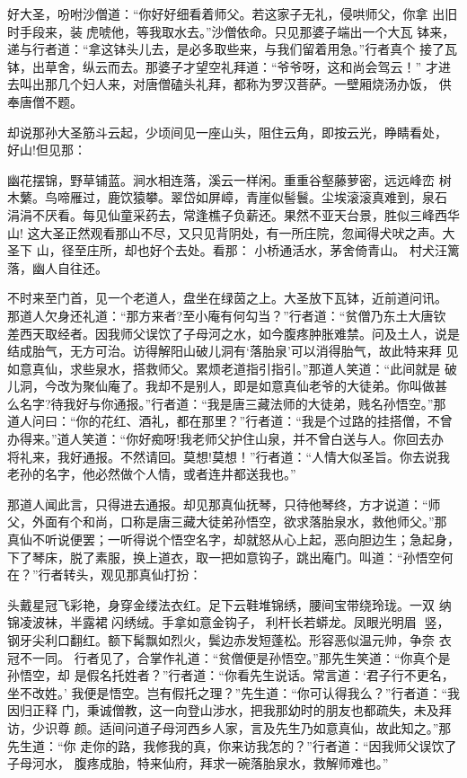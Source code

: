 好大圣，吩咐沙僧道：“你好好细看着师父。若这家子无礼，侵哄师父，你拿
出旧时手段来，装虎唬他，等我取水去。”沙僧依命。只见那婆子端出一个大瓦
钵来，递与行者道：“拿这钵头儿去，是必多取些来，与我们留着用急。”行者真个
接了瓦钵，出草舍，纵云而去。那婆子才望空礼拜道：“爷爷呀，这和尚会驾云！”
才进去叫出那几个妇人来，对唐僧磕头礼拜，都称为罗汉菩萨。一壁厢烧汤办饭，
供奉唐僧不题。

却说那孙大圣筋斗云起，少顷间见一座山头，阻住云角，即按云光，睁睛看处，
好山!但见那：

幽花摆锦，野草铺蓝。涧水相连落，溪云一样闲。重重谷壑藤萝密，远远峰峦
树木蘩。鸟啼雁过，鹿饮猿攀。翠岱如屏嶂，青崖似髻鬟。尘埃滚滚真难到，泉石
涓涓不厌看。每见仙童采药去，常逢樵子负薪还。果然不亚天台景，胜似三峰西华
山!
这大圣正然观看那山不尽，又只见背阴处，有一所庄院，忽闻得犬吠之声。大圣下
山，径至庄所，却也好个去处。看那：
小桥通活水，茅舍倚青山。
村犬汪篱落，幽人自往还。

不时来至门首，见一个老道人，盘坐在绿茵之上。大圣放下瓦钵，近前道问讯。
那道人欠身还礼道：“那方来者?至小庵有何勾当？”行者道：“贫僧乃东土大唐钦
差西天取经者。因我师父误饮了子母河之水，如今腹疼肿胀难禁。问及土人，说是
结成胎气，无方可治。访得解阳山破儿洞有‘落胎泉’可以消得胎气，故此特来拜
见如意真仙，求些泉水，搭救师父。累烦老道指引指引。”那道人笑道：“此间就是
破儿洞，今改为聚仙庵了。我却不是别人，即是如意真仙老爷的大徒弟。你叫做甚
么名字?待我好与你通报。”行者道：“我是唐三藏法师的大徒弟，贱名孙悟空。”那
道人问曰：“你的花红、酒礼，都在那里？”行者道：“我是个过路的挂搭僧，不曾
办得来。”道人笑道：“你好痴呀!我老师父护住山泉，并不曾白送与人。你回去办
将礼来，我好通报。不然请回。莫想!莫想！”行者道：“人情大似圣旨。你去说我
老孙的名字，他必然做个人情，或者连井都送我也。”

那道人闻此言，只得进去通报。却见那真仙抚琴，只待他琴终，方才说道：“师
父，外面有个和尚，口称是唐三藏大徒弟孙悟空，欲求落胎泉水，救他师父。”那
真仙不听说便罢；一听得说个悟空名字，却就怒从心上起，恶向胆边生；急起身，
下了琴床，脱了素服，换上道衣，取一把如意钩子，跳出庵门。叫道：“孙悟空何
在？”行者转头，观见那真仙打扮：

头戴星冠飞彩艳，身穿金缕法衣红。足下云鞋堆锦绣，腰间宝带绕玲珑。一双
纳锦凌波袜，半露裙闪绣绒。手拿如意金钩子，利杆长若蟒龙。凤眼光明眉
竖，钢牙尖利口翻红。额下髯飘如烈火，鬓边赤发短蓬松。形容恶似温元帅，争奈
衣冠不一同。
行者见了，合掌作礼道：“贫僧便是孙悟空。”那先生笑道：“你真个是孙悟空，却
是假名托姓者？”行者道：“你看先生说话。常言道：‘君子行不更名，坐不改姓。’
我便是悟空。岂有假托之理？”先生道：“你可认得我么？”行者道：“我因归正释
门，秉诚僧教，这一向登山涉水，把我那幼时的朋友也都疏失，未及拜访，少识尊
颜。适间问道子母河西乡人家，言及先生乃如意真仙，故此知之。”那先生道：“你
走你的路，我修我的真，你来访我怎的？”行者道：“因我师父误饮了子母河水，
腹疼成胎，特来仙府，拜求一碗落胎泉水，救解师难也。”

